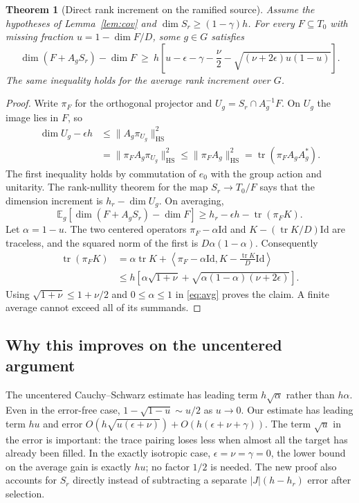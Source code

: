 \documentclass[11pt]{article}
\newtheorem{theorem}{Theorem}[section]
\theoremstyle{remark}\newtheorem{remark}[theorem]{Remark}
\newcommand{\tr}{\operatorname{tr}}
\newcommand{\HS}{\mathrm{HS}}
\newcommand{\id}{\mathrm{Id}}
\newcommand{\E}{\mathbb E}
\begin{document}
\begin{theorem}[Direct rank increment on the ramified source]\label{thm:increment}
Assume the hypotheses of Lemma~\ref{lem:cov} and $\dim S_r\ge(1-\gamma)h$. For every $F\subseteq T_0$ with missing fraction $u=1-\dim F/D$, some $g\in G$ satisfies
\begin{equation}\label{eq:increment}
\dim(F+A_g S_r)-\dim F
\ \ge\ h\left[u-\epsilon-\gamma-\frac{\nu}{2}-\sqrt{(\nu+2\epsilon)u(1-u)}\right].
\end{equation}
The same inequality holds for the average rank increment over $G$.
\end{theorem}
\begin{proof}
Write $\pi_F$ for the orthogonal projector and $U_g=S_r\cap A_g^{-1}F$. On $U_g$ the image lies in $F$, so
\begin{align*}
\dim U_g-\epsilon h&\le\|A_g\pi_{U_g}\|_{\HS}^2\\
 &=\|\pi_F A_g\pi_{U_g}\|_{\HS}^2\le\|\pi_F A_g\|_{\HS}^2=\tr(\pi_F A_gA_g^*).
\end{align*}
The first inequality holds by commutation of $e_0$ with the group action and unitarity. The rank-nullity theorem for the map $S_r\to T_0/F$ says that the dimension increment is $h_r-\dim U_g$. On averaging,
\begin{equation}\label{eq:avg}
\E_g[\dim(F+A_gS_r)-\dim F]\ge h_r-\epsilon h-\tr(\pi_F K).
\end{equation}
Let $\alpha=1-u$. The two centered operators $\pi_F-\alpha\id$ and $K-(\tr K/D)\id$ are traceless, and the squared norm of the first is $D\alpha(1-\alpha)$. Consequently
\begin{align*}
\tr(\pi_F K)&=\alpha\tr K+\left\langle\pi_F-\alpha\id,K-\frac{\tr K}{D}\id\right\rangle\\
&\le h\left[\alpha\sqrt{1+\nu}+\sqrt{\alpha(1-\alpha)(\nu+2\epsilon)}\right].
\end{align*}
Using $\sqrt{1+\nu}\le1+\nu/2$ and $0\le\alpha\le1$ in \eqref{eq:avg} proves the claim. A finite average cannot exceed all of its summands.
\end{proof}

\subsection{Why this improves on the uncentered argument}
The uncentered Cauchy--Schwarz estimate has leading term $h\sqrt{\alpha}$ rather than $h\alpha$. Even in the error-free case, $1-\sqrt{1-u}\sim u/2$ as $u\to0$. Our estimate has leading term $hu$ and error $O(h\sqrt{u(\epsilon+\nu)})+O(h(\epsilon+\nu+\gamma))$. The term $\sqrt u$ in the error is important: the trace pairing loses less when almost all the target has already been filled. In the exactly isotropic case, $\epsilon=\nu=\gamma=0$, the lower bound on the average gain is exactly $hu$; no factor $1/2$ is needed. The new proof also accounts for $S_r$ directly instead of subtracting a separate $|J|(h-h_r)$ error after selection.
\end{document}
